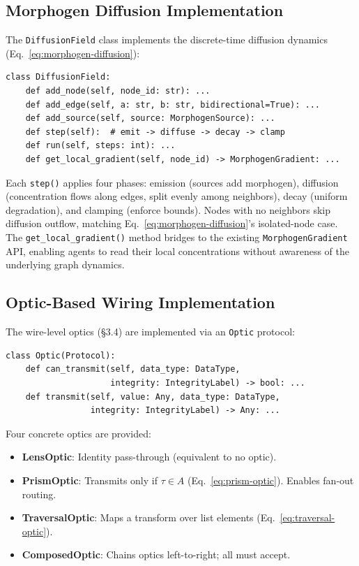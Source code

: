 \subsection{Morphogen Diffusion Implementation}

The \texttt{DiffusionField} class implements the discrete-time diffusion dynamics (Eq.~\eqref{eq:morphogen-diffusion}):

\begin{verbatim}
class DiffusionField:
    def add_node(self, node_id: str): ...
    def add_edge(self, a: str, b: str, bidirectional=True): ...
    def add_source(self, source: MorphogenSource): ...
    def step(self):  # emit -> diffuse -> decay -> clamp
    def run(self, steps: int): ...
    def get_local_gradient(self, node_id) -> MorphogenGradient: ...
\end{verbatim}

Each \texttt{step()} applies four phases: emission (sources add morphogen), diffusion (concentration flows along edges, split evenly among neighbors), decay (uniform degradation), and clamping (enforce bounds). Nodes with no neighbors skip diffusion outflow, matching Eq.~\eqref{eq:morphogen-diffusion}'s isolated-node case. The \texttt{get\_local\_gradient()} method bridges to the existing \texttt{MorphogenGradient} API, enabling agents to read their local concentrations without awareness of the underlying graph dynamics.

\subsection{Optic-Based Wiring Implementation}

The wire-level optics (\S3.4) are implemented via an \texttt{Optic} protocol:

\begin{verbatim}
class Optic(Protocol):
    def can_transmit(self, data_type: DataType,
                     integrity: IntegrityLabel) -> bool: ...
    def transmit(self, value: Any, data_type: DataType,
                 integrity: IntegrityLabel) -> Any: ...
\end{verbatim}

Four concrete optics are provided:
\begin{itemize}[leftmargin=*]
\item \textbf{LensOptic}: Identity pass-through (equivalent to no optic).
\item \textbf{PrismOptic}: Transmits only if $\tau \in A$ (Eq.~\eqref{eq:prism-optic}). Enables fan-out routing.
\item \textbf{TraversalOptic}: Maps a transform over list elements (Eq.~\eqref{eq:traversal-optic}).
\item \textbf{ComposedOptic}: Chains optics left-to-right; all must accept.
\end{itemize}

